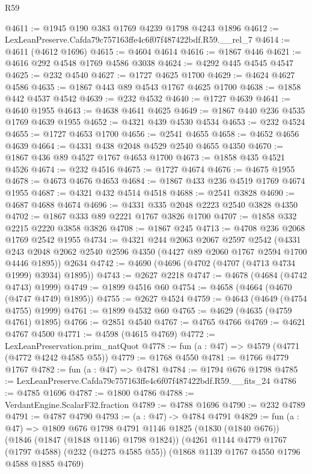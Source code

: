 \begin{lexlean}{R59}
\begin{coremodule}
@4611 := @1945 @190 @383 @1769 @4239 @1798 @4243 @1896
@4612 := LexLeanPreserve.Cafda79c757163ffe4c6f07f487422bdf.R59.__rel_7
@4614 := @4611 (@4612 @1696)
@4615 := @4604 @4614
@4616 := @1867 @446
@4621 := @4616 @292 @4548 @1769 @4586 @3038
@4624 := @4292 @445 @4545 @4547
@4625 := @232 @4540
@4627 := @1727 @4625 @1700
@4629 := @4624 @4627 @4586
@4635 := @1867 @443 @89 @4543 @1767 @4625 @1700
@4638 := @1858 @442 @4537 @4542
@4639 := @232 @4532
@4640 := @1727 @4639
@4641 := @4640 @1955
@4643 := @4638 @4641 @4625
@4649 := @1867 @440 @236 @4535 @1769 @4639 @1955
@4652 := @4321 @439 @4530 @4534
@4653 := @232 @4524
@4655 := @1727 @4653 @1700
@4656 := @2541 @4655
@4658 := @4652 @4656 @4639
@4664 := @4331 @438 @2048 @4529 @2540 @4655 @4350
@4670 := @1867 @436 @89 @4527 @1767 @4653 @1700
@4673 := @1858 @435 @4521 @4526
@4674 := @232 @4516
@4675 := @1727 @4674
@4676 := @4675 @1955
@4678 := @4673 @4676 @4653
@4684 := @1867 @433 @236 @4519 @1769 @4674 @1955
@4687 := @4321 @432 @4514 @4518
@4688 := @2541 @3828
@4690 := @4687 @4688 @4674
@4696 := @4331 @335 @2048 @2223 @2540 @3828 @4350
@4702 := @1867 @333 @89 @2221 @1767 @3826 @1700
@4707 := @1858 @332 @2215 @2220 @3858 @3826
@4708 := @1867 @245
@4713 := @4708 @236 @2068 @1769 @2542 @1955
@4734 := @4321
    @244
    @2063
    @2067
    @2597
    @2542
    (@4331 @243 @2048 @2062 @2540 @2596 @4350 (@4427 @89 @2060 @1767 @2594 @1700 @4446 @1895))
    @2634
@4742 := @4690 (@4696 (@4702 (@4707 (@4713 @4734 @1999) @3934) @1895))
@4743 := @2627 @2218
@4747 := @4678 (@4684 (@4742 @4743) @1999)
@4749 := @1899 @4516 @60
@4754 := @4658 (@4664 (@4670 (@4747 @4749) @1895))
@4755 := @2627 @4524
@4759 := @4643 (@4649 (@4754 @4755) @1999)
@4761 := @1899 @4532 @60
@4765 := @4629 (@4635 (@4759 @4761) @1895)
@4766 := @2851 @4540
@4767 := @4765 @4766
@4769 := @4621 @4767 @4500
@4771 := @4598 (@4615 @4769)
@4772 := LexLeanPreservation.prim_natQuot
@4778 := fun (a : @47) => @4579 (@4771 (@4772 @4242 @4585 @55))
@4779 := @1768 @4550
@4781 := @1766 @4779 @1767
@4782 := fun (a : @47) => @4781
@4784 := @1794 @676 @1798
@4785 := LexLeanPreserve.Cafda79c757163ffe4c6f07f487422bdf.R59.__fits_24
@4786 := @4785 @1696
@4787 := @1800 @4786
@4788 := VerdantEngine.ScalarF32.fraction
@4789 := @4788 @1696
@4790 := @232 @4789
@4791 := @4787 @4790
@4793 := (a : @47) -> @4784 @4791
@4829 := fun (a : @47) =>
  @1809
    @676
    @1798
    @4791
    @1146
    @1825
    (@1830 (@1840 @676))
    (@1846 (@1847 (@1848 @1146) @1798 @1824))
    (@4261
      @1144
      @4779
      @1767
      (@1797 @4588)
      (@232 (@4275 @4585 @55))
      (@1868 @1139 @1767 @4550 @1796 @4588 @1885 @4769)

\end{coremodule}
\end{lexlean}
